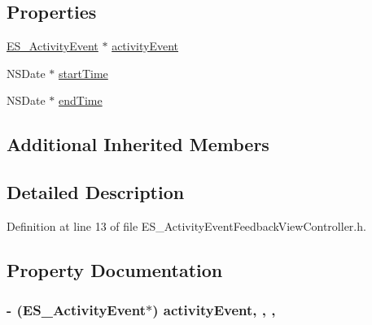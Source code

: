 \subsection*{Properties}
\begin{DoxyCompactItemize}
\item 
\hyperlink{interface_e_s___activity_event}{E\+S\+\_\+\+Activity\+Event} $\ast$ \hyperlink{interface_e_s___activity_event_feedback_view_controller_a491f5439700a88e921dee733b3f180c2}{activity\+Event}
\item 
N\+S\+Date $\ast$ \hyperlink{interface_e_s___activity_event_feedback_view_controller_a2b29282830a592c87190d3148fd34715}{start\+Time}
\item 
N\+S\+Date $\ast$ \hyperlink{interface_e_s___activity_event_feedback_view_controller_ac3657a5fd7911500e10f1857565c0ed5}{end\+Time}
\end{DoxyCompactItemize}
\subsection*{Additional Inherited Members}


\subsection{Detailed Description}


Definition at line 13 of file E\+S\+\_\+\+Activity\+Event\+Feedback\+View\+Controller.\+h.



\subsection{Property Documentation}
\hypertarget{interface_e_s___activity_event_feedback_view_controller_a491f5439700a88e921dee733b3f180c2}{
\subsubsection[{activity\+Event}]{\setlength{\rightskip}{0pt plus 5cm}-\/ ({\bf E\+S\+\_\+\+Activity\+Event}$\ast$) activity\+Event\hspace{0.3cm}{\ttfamily [read]}, {\ttfamily [write]}, {\ttfamily [nonatomic]}, {\ttfamily [strong]}}}\label{interface_e_s___activity_event_feedback_view_controller_a491f5439700a88e921dee733b3f180c2}


